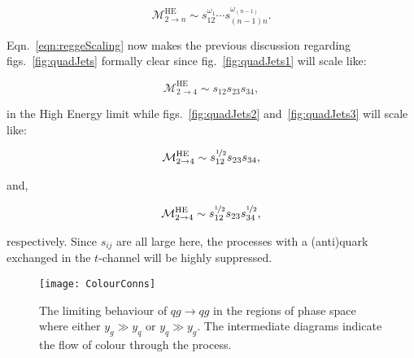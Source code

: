 	\begin{equation}
		\mathcal{M}^{\text{HE}}_{2\to n}\sim s_{12}^{\omega_1}\cdots s_{(n-1)n}^{\omega_{(n-1)}}.
		\label{eqn:reggeScaling}
	\end{equation}

	Eqn.~\eqref{eqn:reggeScaling} now makes the previous discussion regarding figs.~\eqref{fig:quadJets}
	formally clear since fig.~\eqref{fig:quadJets1} will scale like:

	\begin{equation}
		\mathcal{M}^{\text{HE}}_{2\to 4} \sim s_{12}s_{23}s_{34},
	\end{equation}

	in the High Energy limit while figs.~\eqref{fig:quadJets2} and~\eqref{fig:quadJets3} will scale
	like:

	\begin{align}
	\begin{split}
		\mathcal{M}^{\text{HE}}_{2\to 4} \sim s_{12}^{\nicefrac{1}{2}}s_{23}s_{34},\\
	\end{split}
	\end{align}

	and,

	\begin{align}
	\begin{split}
		\mathcal{M}^{\text{HE}}_{2\to 4} \sim s_{12}^{\nicefrac{1}{2}}s_{23}s_{34}^{\nicefrac{1}{2}},
	\end{split}
	\end{align}

	respectively.  Since $s_{ij}$ are all large here, the processes with a (anti)quark exchanged
	in the $t$-channel will be highly suppressed.

	\begin{figure}
		\begin{center}
		\texttt{[image: ColourConns]}
		\caption{The limiting behaviour of $qg\to qg$ in the regions of phase space where
		either $y_g\gg y_q$ or $y_q\gg y_g$.  The intermediate diagrams indicate the flow
		of colour through the process.}
		\label{fig:colorConns}
		\end{center}
	\end{figure}

